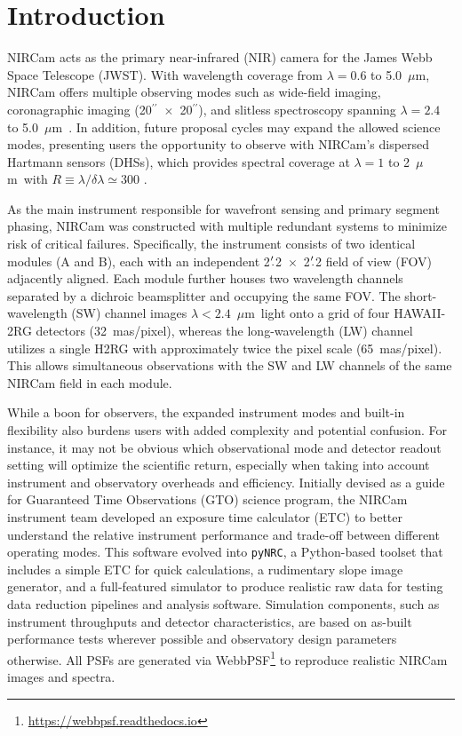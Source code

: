 \documentclass[modern, linenumbers]{aastex62}
\def\arcsec{{$^{\prime\prime}$}}
\def\ptmin{$^{\prime}\mskip-4.0mu.$}
\newcommand{\um}{$\mu$m}
\newcommand{\pynrc}{\texttt{\MakeLowercase{py}NRC}}
\begin{document}

\section{Introduction}

NIRCam acts as the primary near-infrared (NIR) camera for the James Webb Space Telescope (JWST). With wavelength coverage from $\lambda=0.6$ to 5.0~\um, NIRCam offers multiple observing modes such as wide-field imaging, coronagraphic imaging (20\arcsec~$\times$~20\arcsec), and slitless spectroscopy spanning $\lambda=2.4$ to 5.0~\um\ \citep{beic12, kris07, riek05, gree07, gree17}. In addition, future proposal cycles may expand the allowed science modes, presenting users the opportunity to observe with NIRCam's dispersed Hartmann sensors (DHSs), which provides spectral coverage at $\lambda=1$ to 2~\um\ with $R \equiv \lambda/\delta\lambda \simeq 300$ \citep{schl17}.

As the main instrument responsible for wavefront sensing and primary segment phasing, NIRCam was constructed with multiple redundant systems to minimize risk of critical failures. Specifically, the instrument consists of two identical modules (A and B), each with an independent 2\ptmin2~$\times$~2\ptmin2 field of view (FOV) adjacently aligned. Each module further houses two wavelength channels separated by a dichroic beamsplitter and occupying the same FOV. The short-wavelength (SW) channel images $\lambda<2.4$~\um\ light onto a grid of four HAWAII-2RG \citep[H2RG;][]{bele08} detectors (32~mas/pixel), whereas the long-wavelength (LW) channel utilizes a single H2RG with approximately twice the pixel scale (65~mas/pixel). This allows simultaneous observations with the SW and LW channels of the same NIRCam field in each module.

While a boon for observers, the expanded instrument modes and built-in flexibility also burdens users with added complexity and potential confusion. 
For instance, it may not be obvious which observational mode and detector readout setting will optimize the scientific return, especially when taking into account instrument and observatory overheads and efficiency. 
Initially devised as a guide for Guaranteed Time Observations (GTO) science program, the NIRCam instrument team developed an exposure time calculator (ETC) to better understand the relative instrument performance and trade-off between different operating modes. 
This software evolved into \pynrc, a Python-based toolset that includes a simple ETC for quick calculations, a rudimentary slope image generator, and a full-featured simulator to produce realistic raw data for testing data reduction pipelines and analysis software. 
Simulation components, such as instrument throughputs and detector characteristics, are based on as-built performance tests wherever possible and observatory design parameters otherwise. 
All PSFs are generated via WebbPSF\footnote{\url{https://webbpsf.readthedocs.io}} \citep{perr12,perr14} to reproduce realistic NIRCam images and spectra.
\end{document}
